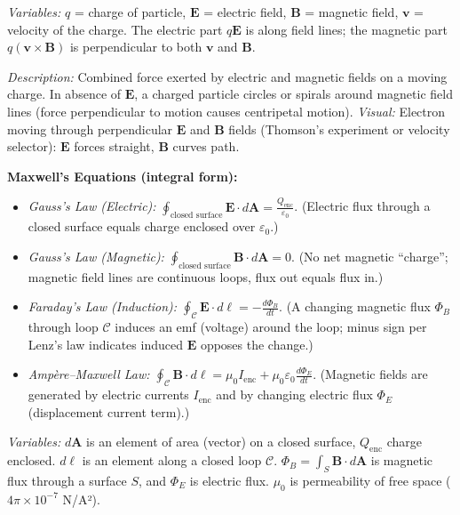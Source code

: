 \documentclass{article}
\begin{document}
\textit{Variables:} $q$ = charge of particle, $\mathbf{E}$ = electric field, $\mathbf{B}$ = magnetic field, $\mathbf{v}$ = velocity of the charge. The electric part $q\mathbf{E}$ is along field lines; the magnetic part $q(\mathbf{v}\times\mathbf{B})$ is perpendicular to both $\mathbf{v}$ and $\mathbf{B}$.

\textit{Description:} Combined force exerted by electric and magnetic fields on a moving charge. In absence of $\mathbf{E}$, a charged particle circles or spirals around magnetic field lines (force perpendicular to motion causes centripetal motion). \textit{Visual:} Electron moving through perpendicular $\mathbf{E}$ and $\mathbf{B}$ fields (Thomson’s experiment or velocity selector): $\mathbf{E}$ forces straight, $\mathbf{B}$ curves path.

\textbf{Maxwell’s Equations (integral form):}

\begin{itemize}
\item \textit{Gauss’s Law (Electric):} $\displaystyle \oint_{\text{closed surface}} \mathbf{E}\cdot d\mathbf{A} = \frac{Q_{\text{enc}}}{\varepsilon_0}$. (Electric flux through a closed surface equals charge enclosed over $\varepsilon_0$.)
\item \textit{Gauss’s Law (Magnetic):} $\displaystyle \oint_{\text{closed surface}} \mathbf{B}\cdot d\mathbf{A} = 0$. (No net magnetic “charge”; magnetic field lines are continuous loops, flux out equals flux in.)
\item \textit{Faraday’s Law (Induction):} $\displaystyle \oint_{\mathcal{C}} \mathbf{E}\cdot d\boldsymbol{\ell} = -\frac{d\Phi_B}{dt}$. (A changing magnetic flux $\Phi_B$ through loop $\mathcal{C}$ induces an emf (voltage) around the loop; minus sign per Lenz’s law indicates induced $\mathbf{E}$ opposes the change.)
\item \textit{Ampère–Maxwell Law:} $\displaystyle \oint_{\mathcal{C}} \mathbf{B}\cdot d\boldsymbol{\ell} = \mu_0 I_{\text{enc}} + \mu_0\varepsilon_0 \frac{d\Phi_E}{dt}$. (Magnetic fields are generated by electric currents $I_{\text{enc}}$ and by changing electric flux $\Phi_E$ (displacement current term).)
\end{itemize}

\textit{Variables:} $d\mathbf{A}$ is an element of area (vector) on a closed surface, $Q_{\text{enc}}$ charge enclosed. $d\boldsymbol{\ell}$ is an element along a closed loop $\mathcal{C}$. $\Phi_B = \int_S \mathbf{B}\cdot d\mathbf{A}$ is magnetic flux through a surface $S$, and $\Phi_E$ is electric flux. $\mu_0$ is permeability of free space ($4\pi \times 10^{-7}$ N/A²).
\end{document}
